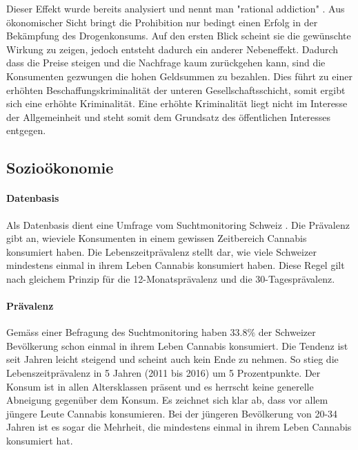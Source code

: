 \documentclass[../main.tex]{subfiles}
\begin{document}
	
	\noindent
	Dieser Effekt wurde bereits analysiert und nennt man "rational addiction" \cite{becker}.
	Aus ökonomischer Sicht bringt die Prohibition nur bedingt einen Erfolg in der Bekämpfung des Drogenkonsums. 
	Auf den ersten Blick scheint sie die gewünschte Wirkung zu zeigen, jedoch entsteht dadurch ein anderer Nebeneffekt. 
	Dadurch dass die Preise steigen und die Nachfrage kaum zurückgehen kann, sind die Konsumenten gezwungen die hohen Geldsummen zu bezahlen.
	Dies führt zu einer erhöhten Beschaffungskriminalität der unteren Gesellschaftsschicht, somit ergibt sich eine erhöhte Kriminalität. 
	Eine erhöhte Kriminalität liegt nicht im Interesse der Allgemeinheit und steht somit dem Grundsatz des öffentlichen Interesses entgegen.
	

	
	\subsection{Sozioökonomie}
	
	\paragraph{Datenbasis}
	Als Datenbasis dient eine Umfrage vom Suchtmonitoring Schweiz \cite{gmel}.
	Die Prävalenz gibt an, wieviele Konsumenten in einem gewissen Zeitbereich Cannabis konsumiert haben.
	Die Lebenszeitprävalenz stellt dar, wie viele Schweizer mindestens einmal in ihrem Leben Cannabis konsumiert haben.
	Diese Regel gilt nach gleichem Prinzip für die 12-Monatsprävalenz und die 30-Tagesprävalenz.
	
	\paragraph{Prävalenz}	
	Gemäss einer Befragung des Suchtmonitoring haben $33.8\%$ der Schweizer Bevölkerung schon einmal in ihrem Leben Cannabis konsumiert.
	Die Tendenz ist seit Jahren leicht steigend und scheint auch kein Ende zu nehmen. 
	So stieg die Lebenszeitprävalenz in 5 Jahren (2011 bis 2016) um 5 Prozentpunkte. 
	Der Konsum ist in allen Altersklassen präsent und es herrscht keine generelle Abneigung gegenüber dem Konsum. 
	Es zeichnet sich klar ab, dass vor allem jüngere Leute Cannabis konsumieren. 
	Bei der jüngeren Bevölkerung von 20-34 Jahren ist es sogar die Mehrheit, die mindestens einmal in ihrem Leben Cannabis konsumiert hat.\\
	
\end{document}

